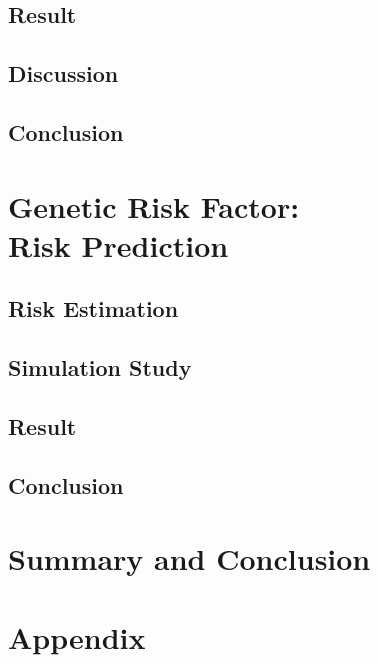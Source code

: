 \documentclass{book}
\begin{document}
		\section{Result}
		\section{Discussion}
		\section{Conclusion}

	\chapter[Genetic Risk Factor - Risk Prediction]{Genetic Risk Factor:\\ Risk Prediction}
		\section{Risk Estimation}
		\section{Simulation Study}
		\section{Result}
		\section{Conclusion}

%
%


	\chapter{Summary and Conclusion}

\backmatter
	
	\printbibliography
	\chapter*{Appendix}
\end{document}
